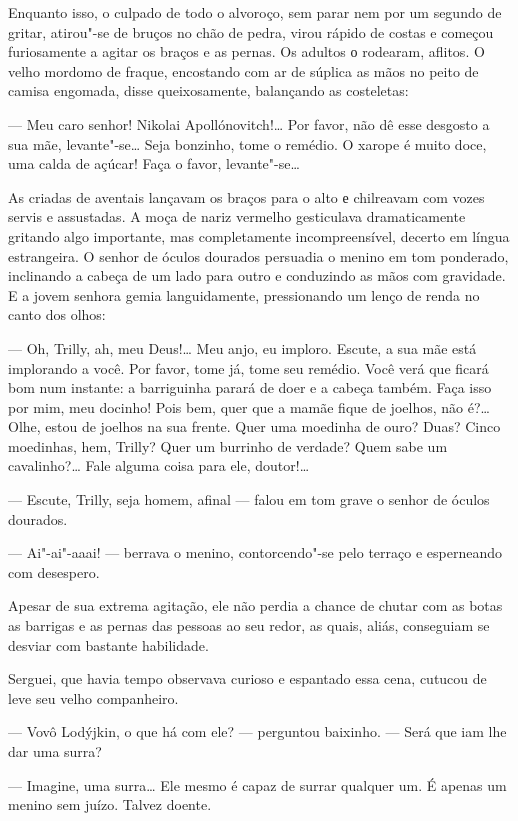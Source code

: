 Enquanto isso, o culpado de todo o alvoroço, sem parar nem por um
segundo de gritar, atirou"-se de bruços no chão de pedra, virou rápido de
costas e começou furiosamente a agitar os braços e as pernas. Os adultos
о rodearam, aflitos. O velho mordomo de fraque, encostando com ar de
súplica as mãos no peito de camisa engomada, disse queixosamente,
balançando as costeletas:

--- Meu caro senhor! Nikolai Apollónovitch!\ldots{} Por favor, não dê esse
desgosto a sua mãe, levante"-se\ldots{} Seja bonzinho, tome o remédio. O
xarope é muito doce, uma calda de açúcar! Faça o favor, levante"-se\ldots{}

As criadas de aventais lançavam os braços para o alto е chilreavam com
vozes servis e assustadas. A moça de nariz vermelho gesticulava
dramaticamente gritando algo importante, mas completamente
incompreensível, decerto em língua estrangeira. O senhor de óculos
dourados persuadia o menino em tom ponderado, inclinando a cabeça de um
lado para outro e conduzindo as mãos com gravidade. E a jovem senhora
gemia languidamente, pressionando um lenço de renda no canto dos olhos:

--- Oh, Trilly, ah, meu Deus!\ldots{} Meu anjo, eu imploro. Escute, a sua mãe
está implorando a você. Por favor, tome já, tome seu remédio. Você verá
que ficará bom num instante: a barriguinha parará de doer e a cabeça
também. Faça isso por mim, meu docinho! Pois bem, quer que a mamãe fique
de joelhos, não é?\ldots{} Olhe, estou de joelhos na sua frente. Quer uma
moedinha de ouro? Duas? Cinco moedinhas, hem, Trilly? Quer um burrinho
de verdade? Quem sabe um cavalinho?\ldots{} Fale alguma coisa para ele,
doutor!\ldots{}

--- Escute, Trilly, seja homem, afinal --- falou em tom grave o senhor
de óculos dourados.

--- Ai"-ai"-aaai! --- berrava o menino, contorcendo"-se pelo terraço e
esperneando com desespero.

Apesar de sua extrema agitação, ele não perdia a chance de chutar com as
botas as barrigas e as pernas das pessoas ao seu redor, as quais, aliás,
conseguiam se desviar com bastante habilidade.

Serguei, que havia tempo observava curioso e espantado essa cena,
cutucou de leve seu velho companheiro.

--- Vovô Lodýjkin, o que há com ele? --- perguntou baixinho. --- Será
que iam lhe dar uma surra?

--- Imagine, uma surra\ldots{} Ele mesmo é capaz de surrar qualquer um. É
apenas um menino sem juízo. Talvez doente.

